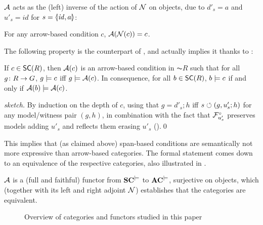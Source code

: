$\mathcal{A}$ acts as the (left) inverse of the action of $\mathcal{N}$ on objects, due to $d'_s=a$ and $u'_s=id$ for $s=\spanof{\id}{a}$:
%
\begin{lemma}
For any arrow-based condition $c$, $\mathcal{A}(\mathcal{N}(c))=c$.
\end{lemma}
%
The following property is the counterpart of , and actually implies it thanks to :
%
\begin{proposition}
If $c\in \SC R$, then $\mathcal{A}(c)$ is an arrow-based condition in $\AC R$ such that for all $g\colon R\rightarrow G$, $g\models c$ iff $g\models\mathcal{A}(c)$. In consequence, for all $b\in \SC R$, $b\models c$ if and only if $\mathcal{A}(b)\models \mathcal{A}(c)$.
\end{proposition}
%
\begin{proof}[sketch]
By induction on the depth of $c$, using that $g=d'_s;h$ iff $s\circlearrowleft (g,u'_s;h)$ for any model/witness pair $(g,h)$, in combination with the fact that $\mathcal{F}^\circ_{u'_s}$ preserves models adding $u'_s$ and reflects them erasing $u'_s$ ().\qed
\end{proof}
%
This implies that (as claimed above) span-based conditions are semantically not more expressive than arrow-based categories. The formal statement comes down to an equivalence of the respective categories, also illustrated in .
%
\begin{theorem}
$\mathcal{A}$ is a (full and faithful) functor from $\mathbf{SC}^{\models}$ to $\mathbf{AC}^{\models}$, surjective on objects, which (together with its left and right adjoint $\mathcal{N}$) establishes that the categories are equivalent.
\end{theorem}


\begin{figure}[t]
\centering

\caption{Overview of categories and functors studied in this paper}
\end{figure}

